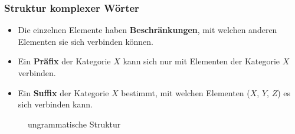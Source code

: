 \begin{frame}
\frametitle{Struktur komplexer Wörter}

\begin{minipage}{.66\textwidth}

\begin{itemize}
	
	\item Die einzelnen Elemente haben \textbf{Beschränkungen}, mit welchen anderen Elementen sie sich verbinden können.

\pause 
	
	\item Ein \textbf{Präfix} der Kategorie $X$ kann sich nur mit Elementen der Kategorie $X$ verbinden.

	\z 	

	
	\item Ein \textbf{Suffix} der Kategorie $X$ bestimmt, mit welchen Elementen (\zB $X$, $Y$, $Z$) es sich verbinden kann.
	
	\z 
\end{itemize}

\end{minipage}
%
\hfill%
%
\begin{minipage}{.32\textwidth}

\begin{figure}	
\centering
{}
\caption{ungrammatische Struktur}
\end{figure}

\end{minipage}
\end{frame}


